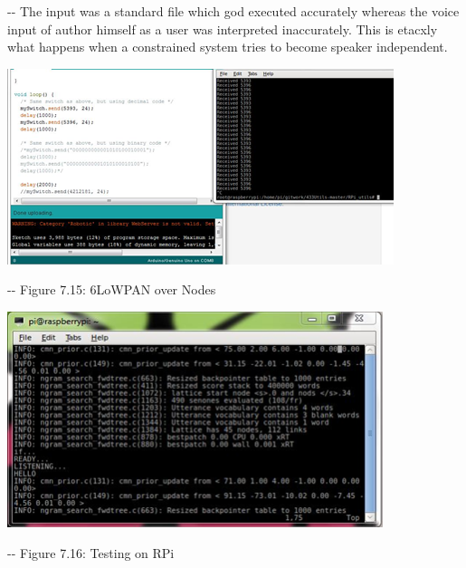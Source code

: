 \documentclass[12pt]{article}
\makeatletter
\newenvironment{indentation}[3]%
	{\par\setlength{\parindent}{#3}
	\setlength{\leftmargin}{#1}       \setlength{\rightmargin}{#2}%
	\advance\linewidth -\leftmargin       \advance\linewidth -\rightmargin%
	\advance\@totalleftmargin\leftmargin  \@setpar{{\@@par}}%
	\parshape 1\@totalleftmargin \linewidth\ignorespaces}{\par}%
\makeatother
\begin{document}
\begin{indentation}{0pt}{0pt}{0pt}
The input was a standard file which god executed accurately whereas the voice
input of author himself as a user was interpreted inaccurately. This is etacxly
what happens when a constrained system tries to become speaker independent.
\end{indentation}
\includegraphics[width=320pt]{img-28.png}
\begin{center}
\begin{indentation}{0pt}{0pt}{0pt}
Figure 7.15: 6LoWPAN over Nodes
\end{indentation}
\end{center}
\includegraphics[width=311pt]{img-29.png}
\begin{center}
\begin{indentation}{0pt}{0pt}{0pt}
Figure 7.16: Testing on RPi
\end{indentation}
\end{center}
\end{document}
